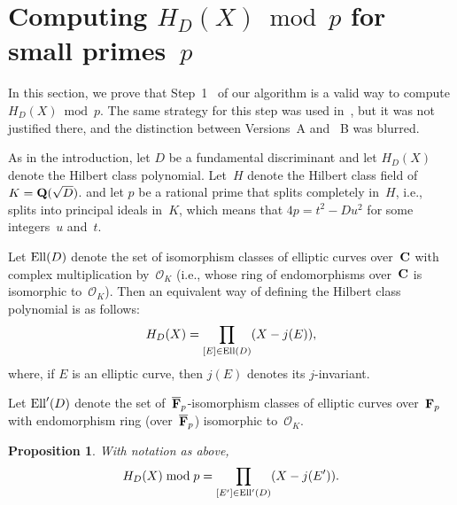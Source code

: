 \documentclass{amsart}
\newcommand{\Q}{{\bf{Q}}}
\newcommand{\C}{{\bf{C}}}
\newcommand{\F}{{\bf{F}}}
\newcommand{\Fp}{{\F}_p}
\newcommand{\OO}{\mathcal{O}}
\newcommand{\Ell}{{\rm{Ell}}}
\theoremstyle{plain}
\newtheorem{prop}[lem]{Proposition}
\begin{document}
\section{Computing $H_D(X) \bmod p$ for small primes~$p$}
\label{section:hdxmodp}

In this section, we prove that Step~1~ of our algorithm is a valid way
to compute $H_D(X) \bmod p$. 
The same strategy for this step was used in~\cite[\S4]{cnst},
but it was not justified there, and the distinction between 
Versions~A and ~B was blurred.

As in the introduction, let $D$ be a fundamental discriminant 
and let $H_D(X)$ denote the Hilbert class polynomial.
Let~$H$ denote the Hilbert class field of~$K=\Q(\sqrt{D})$.
and let $p$ be a rational prime that splits completely in~$H$,
i.e., splits into principal ideals in~$K$, which means that
$4p = t^2 - D u^2$ for some integers~$u$ and~$t$. 

Let $\Ell(D)$ denote the set of isomorphism classes 
of elliptic curves over~$\C$ with complex multiplication  
by~$\OO_K$ (i.e., whose ring of endomorphisms over~$\C$ is
isomorphic to~$\OO_K$). Then an equivalent way of defining
the Hilbert class polynomial is as follows: 
\begin{eqnarray} \label{hdx2}
H_D(X) = \prod_{[E] \in \Ell(D)} (X - j(E)),
\end{eqnarray}
where, if $E$ is an elliptic curve, then $j(E)$ denotes its $j$-invariant. 

Let $\Ell'(D)$ denote the set of~$\overline{\F}_p$-isomorphism classes 
of elliptic curves over~$\F_p$ with 
endomorphism ring (over~$\overline{\F}_p$) isomorphic to~$\OO_K$.

\begin{prop} \label{prop:hdxmodp}
With notation as above,
\begin{eqnarray} \label{hdxmodp}
H_D(X) \bmod p = \prod_{[E'] \in \Ell'(D)} (X - j({E'})).
\end{eqnarray}
\end{prop}
\end{document}
